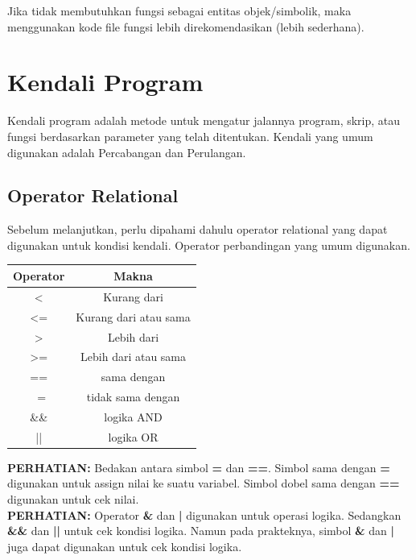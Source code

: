 \documentclass[12pt]{book}
\begin{document}
	Jika tidak membutuhkan fungsi sebagai entitas objek/simbolik, maka menggunakan kode file fungsi lebih direkomendasikan (lebih sederhana).

	\newpage
	\section{Kendali Program}

	Kendali program adalah metode untuk mengatur jalannya program, skrip, atau fungsi berdasarkan parameter yang telah ditentukan.
	Kendali yang umum digunakan adalah Percabangan dan Perulangan.

	\subsection{Operator Relational}

	Sebelum melanjutkan, perlu dipahami dahulu operator relational yang dapat digunakan untuk kondisi kendali.
	Operator perbandingan yang umum digunakan.

	\begin{center}
		\begin{tabular}{|c|c|}
			\hline
			Operator & Makna \\
			\hline\hline
			< & Kurang dari \\
			\hline
			<= & Kurang dari atau sama \\
			\hline
			> & Lebih dari \\
			\hline
			>= & Lebih dari atau sama \\
			\hline
			== & sama dengan \\
			\hline
			~= & tidak sama dengan \\
			\hline
			\&\& & logika AND \\
			\hline
			|| & logika OR \\
			\hline
		\end{tabular}
	\end{center}

	\textbf{PERHATIAN:} Bedakan antara simbol \textbf{=} dan \textbf{==}.
	Simbol sama dengan \textbf{=} digunakan untuk assign nilai ke suatu variabel.
	Simbol dobel sama dengan \textbf{==} digunakan untuk cek nilai.\\

	\textbf{PERHATIAN:} Operator \textbf{\&} dan \textbf{|} digunakan untuk operasi logika.
	Sedangkan \textbf{\&\&} dan \textbf{||} untuk cek kondisi logika.
	Namun pada prakteknya, simbol \textbf{\&} dan \textbf{|} juga dapat digunakan untuk cek kondisi logika.
\end{document}
